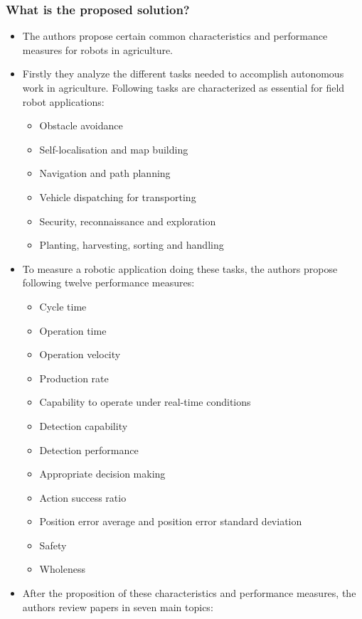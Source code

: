     \subsubsection*{What is the proposed solution?}
    \begin{itemize}
        \item The authors propose certain common characteristics and performance measures for robots in agriculture. 
        \item Firstly they analyze the different tasks needed to accomplish autonomous work in agriculture. Following tasks are characterized as essential for field robot applications: \ \begin{itemize}
            \item Obstacle avoidance
            \item Self-localisation and map building
            \item Navigation and path planning
            \item Vehicle dispatching for transporting
            \item Security, reconnaissance and exploration
            \item Planting, harvesting, sorting and handling
        \end{itemize}
        \item To measure a robotic application doing these tasks, the authors propose following twelve performance measures: \ \begin{itemize}
            \item Cycle time
            \item Operation time
            \item Operation velocity
            \item Production rate
            \item Capability to operate under real-time conditions
            \item Detection capability
            \item Detection performance
            \item Appropriate decision making
            \item Action success ratio
            \item Position error average and position error standard deviation
            \item Safety
            \item Wholeness
        \end{itemize}
        \item After the proposition of these characteristics and performance measures, the authors review papers in seven main topics: \ \begin{itemize}

\end{itemize}
\end{itemize}
